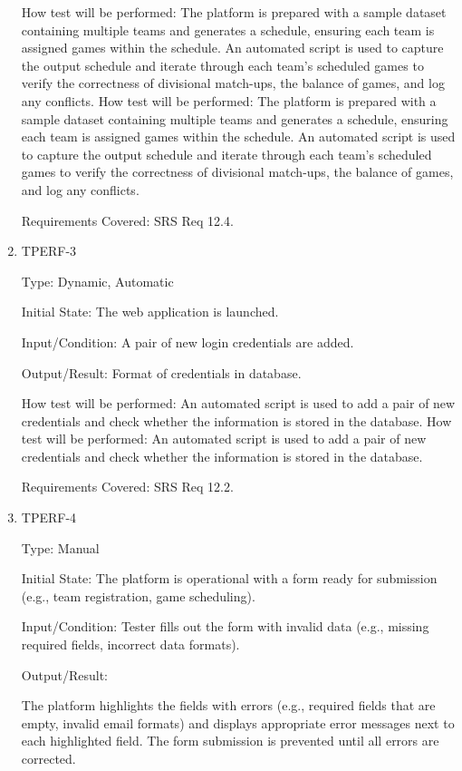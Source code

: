 \documentclass[12pt, titlepage]{article}
\begin{document}
\begin{enumerate}
        How test will be performed:  The platform is prepared with a sample dataset containing multiple teams and generates a schedule, ensuring each team is assigned games within the schedule. An automated script is used to capture the output schedule and iterate through each team's scheduled games to verify the correctness of divisional match-ups, the balance of games, and log any conflicts.
How test will be performed:  The platform is prepared with a sample dataset containing multiple teams and generates a schedule, ensuring each team is assigned games within the schedule. An automated script is used to capture the output schedule and iterate through each team's scheduled games to verify the correctness of divisional match-ups, the balance of games, and log any conflicts.

Requirements Covered: SRS Req 12.4.

\item{TPERF-3\\}

        Type: Dynamic, Automatic

        Initial State: The web application is launched.

        Input/Condition: A pair of new login credentials are added.

        Output/Result: Format of credentials in database.

        How test will be performed: An automated script is used to add a pair of
        new credentials and check whether the information is stored in the database.
How test will be performed: An automated script is used to add a pair of
new credentials and check whether the information is stored in the database.

Requirements Covered: SRS Req 12.2.

\item{TPERF-4\\}

        Type: Manual

        Initial State: The platform is operational with a form ready for submission (e.g., team registration, game scheduling).

        Input/Condition: Tester fills out the form with invalid data (e.g., missing required fields, incorrect data formats).

        Output/Result:

        The platform highlights the fields with errors (e.g., required fields that are empty, invalid email formats) and displays appropriate error messages  next to each highlighted field. The form submission is prevented until all errors are corrected.


\end{enumerate}
\end{document}
